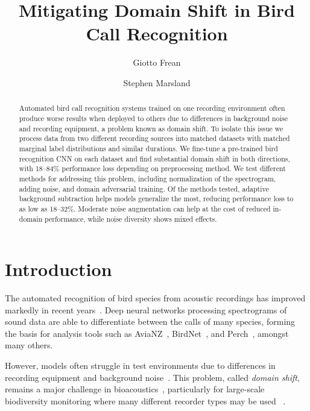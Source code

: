 \documentclass[peer-review]{fa2026}
\title{Mitigating Domain Shift in Bird Call Recognition}
\author[1]{Giotto Frean}
\author[1]{Stephen Marsland}
\affil[1]{School of Mathematics and Statistics, Victoria University of Wellington, New Zealand}
\begin{document}
\maketitle

\begin{abstract}
Automated bird call recognition systems trained on one recording environment often produce worse results when deployed to others due to differences in background noise and recording equipment, a problem known as domain shift. To isolate this issue we process data from two different recording sources into matched datasets with matched marginal label distributions and similar durations. We fine-tune a pre-trained bird recognition CNN on each dataset and find substantial domain shift in both directions, with 18--84\% performance loss depending on preprocessing method. We test different methods for addressing this problem, including normalization of the spectrogram, adding noise, and domain adversarial training. Of the methods tested, adaptive background subtraction helps models generalize the most, reducing performance loss to as low as 18--32\%. Moderate noise augmentation can help at the cost of reduced in-domain performance, while noise diversity shows mixed effects. 
\end{abstract}


\section{Introduction}

The automated recognition of bird species from acoustic recordings has improved markedly in recent years~\cite{stowell2022computational,2018_priyadarshani,2018_stowell}. Deep neural networks processing spectrograms of sound data are able to differentiate between the calls of many species, forming the basis for analysis tools such as AviaNZ~\cite{2019_marsland}, BirdNet~\cite{kahl2021birdnet}, and Perch~\cite{van2025perch}, amongst many others. 

However, models often struggle in test environments due to differences in recording equipment and background noise~\cite{2016_darras}. This problem, called \textit{domain shift}, remains a major challenge in bioacoustics~\cite{Venkateswara2020}, particularly for large-scale biodiversity monitoring where many different recorder types may be used ~\cite{2018_priyadarshani}.
\end{document}
